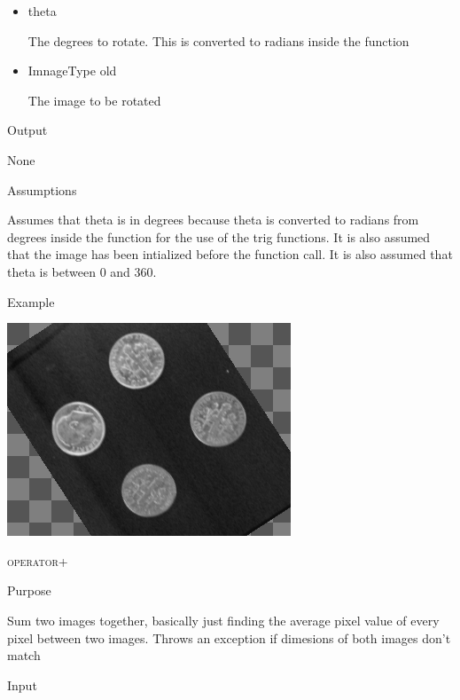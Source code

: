 \documentclass[pdftex, 11pt]{article}
\begin{document}
\begin{description}
\begin{description}
\begin{itemize}
					\item{theta}

						The degrees to rotate. This is converted
						to radians inside the function

					\item{ImnageType old}

						The image to be rotated

				\end{itemize}

			\item{Output}

				None

			\item{Assumptions}

				Assumes that theta is in degrees because theta is
				converted to radians from degrees inside the function
				for the use of the trig functions.
				It is also assumed that the image has been intialized
				before the function call. It is also assumed that theta
				is between 0 and 360.

			\item{Example}

				\includegraphics{images/outrotate.png}

		\end{description}


	\item{\textsc{operator+}}
		\begin{description}
			\item{Purpose}

				
				Sum two images together, basically just finding
				the average pixel value of
				every pixel between two images.  Throws an
				exception if dimesions of both
				images don't match

			\item{Input}

				\begin{itemize}
						

\end{itemize}
\end{description}
\end{description}
\end{document}
